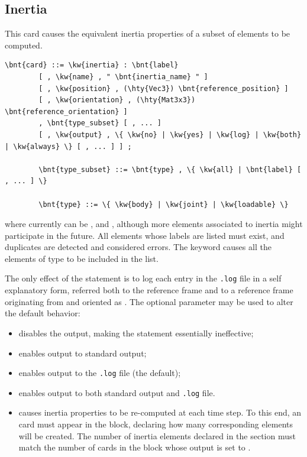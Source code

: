 \subsection{Inertia}\label{sec:EL:MISC:INERTIA}
This card causes the equivalent inertia properties of a subset
of elements to be computed.
\begin{Verbatim}[commandchars=\\\{\}]
    \bnt{card} ::= \kw{inertia} : \bnt{label}
        [ , \kw{name} , " \bnt{inertia_name} " ]
        [ , \kw{position} , (\hty{Vec3}) \bnt{reference_position} ]
        [ , \kw{orientation} , (\hty{Mat3x3}) \bnt{reference_orientation} ]
        , \bnt{type_subset} [ , ... ]
        [ , \kw{output} , \{ \kw{no} | \kw{yes} | \kw{log} | \kw{both} | \kw{always} \} [ , ... ] ] ;

        \bnt{type_subset} ::= \bnt{type} , \{ \kw{all} | \bnt{label} [ , ... ] \}

        \bnt{type} ::= \{ \kw{body} | \kw{joint} | \kw{loadable} \}
\end{Verbatim}
where  currently can be ,  and , 
although more elements associated to inertia might participate in the future.
All elements whose labels are listed must exist, and duplicates
are detected and considered errors.
The keyword  causes all the elements of type  
to be included in the list.

\noindent
The only effect of the  statement is to log
each  entry in the \texttt{.log} file in a self explanatory form,
referred both to the  reference frame and to a reference frame
originating from  and oriented 
as .
The optional parameter  may be used to alter the default 
behavior:
\begin{itemize}
\item {} disables the output, making the  
statement essentially ineffective;
\item {} enables output to standard output;
\item {} enables output to the \texttt{.log} file (the default);
\item {} enables output to both standard output and \texttt{.log} file.
\item {} causes inertia properties to be re-computed at each time step.
To this end, an  card must appear in the  block,
declaring how many corresponding  elements will be created.
The number of inertia elements declared in the  section must match
the number of  cards in the  block whose output is set to .
\end{itemize}



